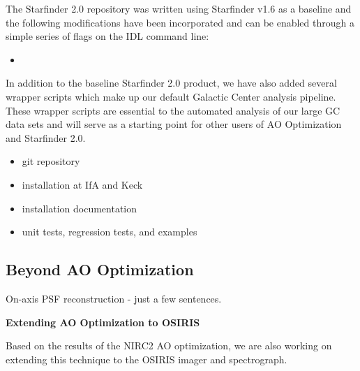 The Starfinder 2.0 repository was written using Starfinder v1.6 as a
baseline and the following modifications have been incorporated and
can be enabled through a simple series of flags on the IDL command
line:
\begin{itemize}
\item
\end{itemize}
In addition to the baseline Starfinder 2.0 product, we have also
added several wrapper scripts which make up our default Galactic
Center analysis pipeline. These wrapper scripts are essential to the
automated analysis of our large GC data sets and will serve as a
starting point for other users of AO Optimization and Starfinder 2.0.



\begin{itemize}
\item git repository
\item installation at IfA and Keck
\item installation documentation
\item unit tests, regression tests, and examples
\end{itemize}

\subsection{Beyond AO Optimization}

On-axis PSF reconstruction - just a few sentences.

\textbf{Extending AO Optimization to OSIRIS}
\label{sec:osiris}

Based on the results of the NIRC2 AO optimization, we are also working on extending this technique to the OSIRIS imager and spectrograph. 
